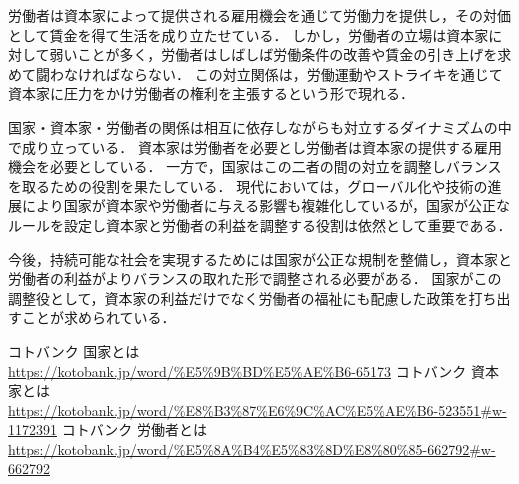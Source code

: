 \documentclass[titlepage,a4paper]{jsarticle}
\begin{document}
労働者は資本家によって提供される雇用機会を通じて労働力を提供し，その対価として賃金を得て生活を成り立たせている．
しかし，労働者の立場は資本家に対して弱いことが多く，労働者はしばしば労働条件の改善や賃金の引き上げを求めて闘わなければならない．
この対立関係は，労働運動やストライキを通じて資本家に圧力をかけ労働者の権利を主張するという形で現れる．

国家・資本家・労働者の関係は相互に依存しながらも対立するダイナミズムの中で成り立っている．
資本家は労働者を必要とし労働者は資本家の提供する雇用機会を必要としている．
一方で，国家はこの二者の間の対立を調整しバランスを取るための役割を果たしている．
現代においては，グローバル化や技術の進展により国家が資本家や労働者に与える影響も複雑化しているが，国家が公正なルールを設定し資本家と労働者の利益を調整する役割は依然として重要である．

今後，持続可能な社会を実現するためには国家が公正な規制を整備し，資本家と労働者の利益がよりバランスの取れた形で調整される必要がある．
国家がこの調整役として，資本家の利益だけでなく労働者の福祉にも配慮した政策を打ち出すことが求められている．
\begin{thebibliography}{99}
   コトバンク 国家とは\\
  \url{https://kotobank.jp/word/%E5%9B%BD%E5%AE%B6-65173}
   コトバンク 資本家とは\\
  \url{https://kotobank.jp/word/%E8%B3%87%E6%9C%AC%E5%AE%B6-523551#w-1172391}
   コトバンク 労働者とは\\
  \url{https://kotobank.jp/word/%E5%8A%B4%E5%83%8D%E8%80%85-662792#w-662792}
\end{thebibliography}
\end{document}
